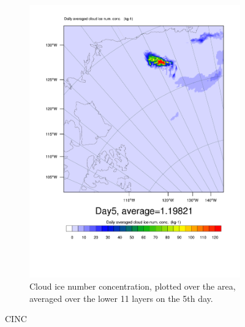 \begin{figure}
\begin{subfigure}{0.48\textwidth}
		\includegraphics[width=\textwidth]{results/control/QNICE_day5.pdf}
		\caption{Cloud ice number concentration, plotted over the area, averaged over the lower 11 layers on the 5th day.}
		\label{subfig:cinc_cont_Day5}
	\end{subfigure}
	\caption{CINC}
	\label{fig:cloudice}
\end{figure}

